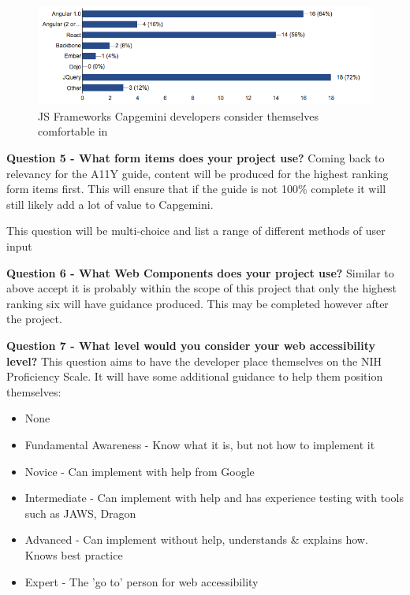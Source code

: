 \begin{figure}[H]
\centering
\centering
\includegraphics[width=\textwidth]{figures/questions/frameworks_competent_in}
\captionsetup{justification=centering}
\caption{JS Frameworks Capgemini developers consider themselves comfortable in
\label{fig:competent_in}}
\end{figure}




\textbf{Question 5 - What form items does your project use?}
Coming back to relevancy for the A11Y guide, content will be produced for the
highest ranking form items first. This will ensure that if the guide is not
100\% complete it will still likely add a lot of value to Capgemini.

This question will be multi-choice and list a range of different methods of
user input

\textbf{Question 6 - What Web Components does your project use?}
Similar to above accept it is probably within the scope of this project that
only the highest ranking six will have guidance produced. This may be
completed however after the project.

\textbf{Question 7 - What level would you consider your web accessibility
level?}
This question aims to have the developer place themselves on the NIH
Proficiency Scale. It will have some additional guidance to help them
position themselves:
\begin{itemize}
\item None
\item Fundamental Awareness - Know what it is, but not how to implement it
\item Novice - Can implement with help from Google
\item Intermediate - Can implement with help and has experience testing with tools such as JAWS, Dragon
\item Advanced  - Can implement without help, understands \& explains how.
Knows best practice
\item Expert - The 'go to' person for web accessibility
\end{itemize}

